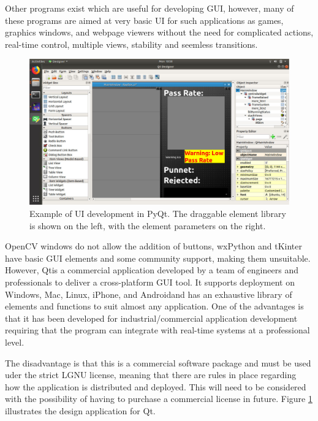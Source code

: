 \documentclass[fleqn,twoside,12pt]{report}
\begin{document}
Other programs exist which are useful for developing GUI, however, many of these programs are aimed at very basic UI for such applications as games, graphics windows, and webpage viewers without the need for complicated actions, real-time control, multiple views, stability and seemless transitions.



\begin{figure}[h]
	\centering
	\includegraphics[width=.8\linewidth]{qt.png}
	\caption{Example of UI development in PyQt\textregistered. The draggable element library is shown on the left, with the element parameters on the right.}
	\label{fig:qt}
\end{figure}%


OpenCV windows do not allow the addition of buttons, wxPython and tKinter have basic GUI elements and some community support, making them unsuitable. However, Qt\textregistered is a commercial application developed by a team of engineers and professionals to deliver a cross-platform GUI tool. It supports deployment on Windows\textregistered, Mac\textregistered, Linux\textregistered, iPhone\textregistered, and Android\textregistered and has an exhaustive library of elements and functions to suit almost any application. One of the advantages is that it has been developed for industrial/commercial application development requiring that the program can integrate with real-time systems at a professional level.




The disadvantage is that this is a commercial software package and must be used uder the strict LGNU license, meaning that there are rules in place regarding how the application is distributed and deployed. This will need to be considered with the possibility of having to purchase a commercial license in future. Figure \ref{fig:qt} illustrates the design application for Qt\textregistered.
\end{document}
